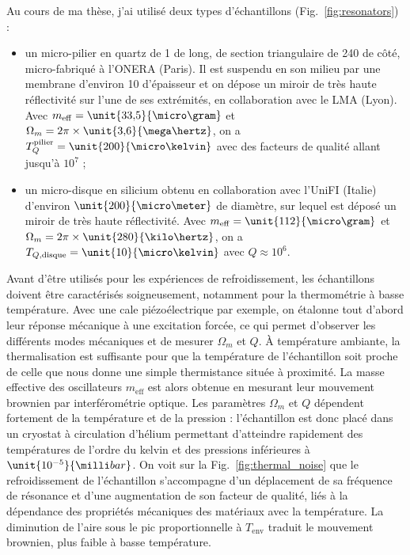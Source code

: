 \documentclass[12pt,a4paper]{article}
\begin{document}
Au cours de ma thèse, j'ai utilisé deux types d'échantillons (Fig.~\ref{fig:resonators}) :
\begin{itemize}
\item un micro-pilier en quartz de \unit{1}{\milli\meter} de long, de section triangulaire de \unit{240}{\micro\meter} de côté, micro-fabriqué à l'ONERA (Paris).
Il est suspendu en son milieu par une membrane d'environ \unit{10}{\micro\meter} d'épaisseur et on dépose un miroir de très haute réflectivité sur l'une de ses extrémités, en collaboration avec le LMA (Lyon).
Avec $m_\mathrm{eff}=\unit{33{,}5}{\micro\gram}$ et $\Omega_m=2\pi\times\unit{3{,}6}{\mega\hertz}$, on a $T_{Q}^\mathrm{pilier} = \unit{200}{\micro\kelvin}$ avec des facteurs de qualité allant jusqu'à $10^7$ ;
\item un micro-disque en silicium obtenu en collaboration avec l'UniFI (Italie) d'environ $\unit{200}{\micro\meter}$ de diamètre, sur lequel est déposé un miroir de très haute réflectivité.
Avec $m_\mathrm{eff}=\unit{112}{\micro\gram}$ et $\Omega_m=2\pi\times\unit{280}{\kilo\hertz}$, on a $T_{Q,\mathrm{disque}} = \unit{10}{\micro\kelvin}$ avec $Q\approx10^6$.
\end{itemize}
Avant d'être utilisés pour les expériences de refroidissement, les échantillons doivent être caractérisés soigneusement, notamment pour la thermométrie à basse température.
Avec une cale piézoélectrique par exemple, on étalonne tout d'abord leur réponse mécanique à une excitation forcée, ce qui permet d'observer les différents modes mécaniques et de mesurer $\Omega_m$ et $Q$.
\`A température ambiante, la thermalisation est suffisante pour que la température de l'échantillon soit proche de celle que nous donne une simple thermistance située à proximité.
La masse effective des oscillateurs $m_\mathrm{eff}$ est alors obtenue en mesurant leur mouvement brownien par interférométrie optique.
Les paramètres $\Omega_m$ et $Q$ dépendent fortement de la température et de la pression  : l'échantillon est donc placé dans un cryostat à circulation d'hélium permettant d'atteindre rapidement des températures de l'ordre du kelvin et des pressions inférieures à $\unit{10^{-5}}{\milli bar}$.
On voit sur la Fig.~\ref{fig:thermal_noise} que le refroidissement de l'échantillon s'accompagne d'un déplacement de sa fréquence de résonance et d'une augmentation de son facteur de qualité, liés à la dépendance des propriétés mécaniques des matériaux avec la température.
La diminution de l'aire sous le pic proportionnelle à $T_\mathrm{env}$ traduit le mouvement brownien, plus faible à basse température.
\end{document}
